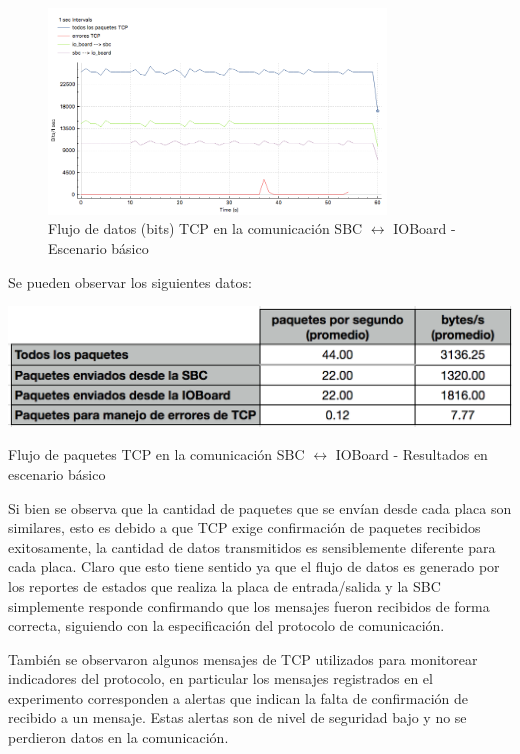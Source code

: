 \documentclass[withindex,glossary]{cam-thesis}
\begin{document}
\begin{figure}[H]
  \centering
  	\includegraphics[width=0.8\textwidth]{images/TCP_Throughput_io_to_pc_basic_bps}
  	\caption[Throughput de la conexión TCP - Básico]{Flujo de datos (bits) TCP en la comunicación SBC $\leftrightarrow$ IOBoard -  Escenario básico}
  \label{fig:TCP_Throughput_io_to_pc_basic_bps}
\end{figure}
Se pueden observar los siguientes datos:
\begin{table}[H]
	\centering
 	\begin{minipage}[b]{0.6\textwidth}  	
  		\includegraphics[width=\textwidth]{images/TCP_Throughput_io_to_pc_basic_results}
  		\caption[Throughput de la conexión TCP - Básico]{Flujo de paquetes TCP en la comunicación SBC $\leftrightarrow$ IOBoard -  Resultados en escenario básico}
		\label{fig:TCP_Throughput_io_to_pc_basic_pkps_results}
	\end{minipage}
\end{table}
Si bien se observa que la cantidad de paquetes que se envían desde cada placa son similares, esto es debido a que TCP exige confirmación de paquetes recibidos exitosamente, la cantidad de datos transmitidos es sensiblemente diferente para cada placa. Claro que esto tiene sentido ya que el flujo de datos es generado por los reportes de estados que realiza la placa de entrada/salida y la SBC simplemente responde confirmando que los mensajes fueron recibidos de forma correcta, siguiendo con la especificación del protocolo de comunicación.

También se observaron algunos mensajes de TCP utilizados para monitorear indicadores del protocolo, en particular los mensajes registrados en el experimento corresponden a alertas que indican la falta de confirmación de recibido a un mensaje. Estas alertas son de nivel de seguridad bajo y no se perdieron datos en la comunicación.
\end{document}
